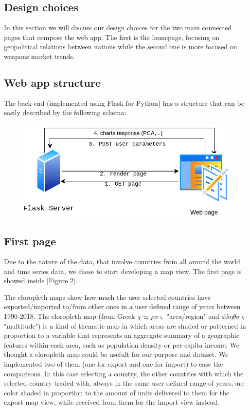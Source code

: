 \documentclass{article}
\begin{document}
\begin{multicols}{2}
\section{Design choices}
%

In this section we will discuss our design choices for the two main connected pages that compose the web app. The first is the homepage, focusing on geopolitical relations between nations while the second one is more focused on weapons market trends.

\subsection{Web app structure}
The back-end (implemented using Flask for Python) has a structure that can be easily described by the following schema:

\begin{figure}[H]
	\centering
	\includegraphics[scale=0.24,center]{./fig/ServerStructure.jpg}
	\label{fig:ss}
	
\end{figure}

\subsection{First page}
Due to the nature of the data, that involve countries from all around the world and time series data, we chose to start developing a map view. The first page is showed inside [Figure 2].

The cloropleth maps show how much the user selected countries have exported/imported to/from other ones in a user defined range of years between 1990-2018. The cloropleth map (from Greek $\chi\varpi\rho\sigma\varsigma$ "area/region" and $\phi\lambda\eta\theta\sigma\varsigma$ "multitude") is a kind of thematic map in which areas are shaded or patterned in proportion to a variable that represents an aggregate summary of a geographic features within each area, such as population density or per-capita income. We thought a cloropleth map could be usefult for our purpose and dataset. We implemented two of them (one for export and one for import) to ease the comparisons. In this case selecting a country, the other countries with which the selected country traded with, always in the same user defined range of years, are color shaded in proportion to the amount of units delivered  to them for the export map view, while received from them for the import view instead.


\end{multicols}
\end{document}
